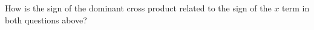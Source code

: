 \documentclass[12pt, a4paper, addpoints]{exam}
\begin{document}
\begin{questions}
\begin{multicols}{2}
\end{multicols}
\question How is the sign of the dominant cross product related to the sign of the $x$ term in both questions above?
\newpage


\end{questions}
\end{document}
